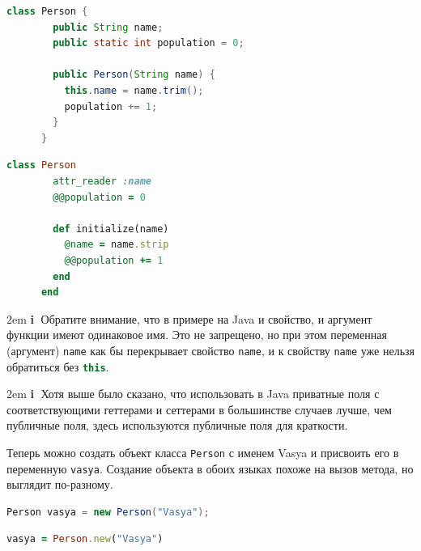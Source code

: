 \documentclass[a4paper, 14pt, titlepage]{extarticle}
\newenvironment{indented}%
    { \begingroup %
        \noindent %
        \leftskip2em %
        \rightskip\leftskip }%
    { \par\endgroup }
\newenvironment{extrainfo}%
    { \begin{indented} %
        \color{dkblue} %
        \small %
        \textbf{\textcircled{\footnotesize i}} }%
    { \end{indented} }
\newenvironment{halfpage}%
    {\noindent\begin{minipage}[h]{0.49\linewidth}} %
    {\end{minipage}\hfill}
\newcommand{\inlinecode}[2][Java]{\lstinline[basicstyle=\ttfamily, language=#1]{#2}}
\begin{document}
  \begin{halfpage}
    \begin{lstlisting}[language=Java, title={Конструктор с параметром в Java}, gobble=6, texcl]
      class Person {
        public String name;
        public static int population = 0;
        
        public Person(String name) {
          this.name = name.trim();
          population += 1;
        }
      }
    \end{lstlisting}
  \end{halfpage}
  \begin{halfpage}
    \begin{lstlisting}[language=Ruby, title={Конструктор с параметром в Ruby}, gobble=6, texcl]
      class Person
        attr_reader :name
        @@population = 0

        def initialize(name)
          @name = name.strip
          @@population += 1
        end
      end
    \end{lstlisting}
  \end{halfpage}

  \begin{extrainfo}
    Обратите внимание, что в примере на Java и свойство, и аргумент функции имеют одинаковое имя.
    Это не запрещено, но при этом переменная (аргумент) \inlinecode{name} как бы перекрывает
    свойство \inlinecode{name}, и к свойству \inlinecode{name} уже нельзя обратиться без
    \inlinecode[Java]{this}.
  \end{extrainfo}

  \begin{extrainfo}
    Хотя выше было сказано, что использовать в Java приватные поля с соответствующими геттерами и
    сеттерами в большинстве случаев лучше, чем публичные поля, здесь используются публичные поля для
    краткости.
  \end{extrainfo}

  Теперь можно создать объект класса \inlinecode{Person} с именем Vasya и присвоить его в
  переменную \inlinecode{vasya}. Создание объекта в обоих языках похоже на вызов метода, но выглядит
  по-разному.

  \begin{halfpage}
    \begin{lstlisting}[language=Java, title={Создание объекта в Java}, gobble=6, texcl]
      Person vasya = new Person("Vasya");
    \end{lstlisting}
  \end{halfpage}
  \begin{halfpage}
    \begin{lstlisting}[language=Ruby, title={Создание объекта в Ruby}, gobble=6, texcl]
      vasya = Person.new("Vasya")
    \end{lstlisting}
  \end{halfpage}
\end{document}
